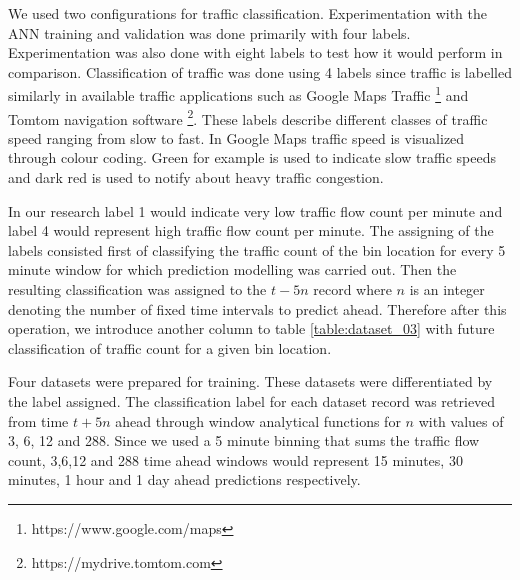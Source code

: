 \documentclass[12pt, a4paper]{report}
\theoremstyle{definition}
\theoremstyle{definition}%
\theoremstyle{definition}%
\theoremstyle{definition}%
\theoremstyle{definition}%
\theoremstyle{definition}%
\begin{document}
We used two configurations for traffic classification. Experimentation with the ANN training and validation was done primarily with four labels. Experimentation was also done with eight labels to test how it would perform in comparison. Classification of traffic was done using 4 labels since traffic is labelled similarly in available traffic applications such as Google Maps Traffic \footnote{https://www.google.com/maps} and Tomtom navigation software \footnote{https://mydrive.tomtom.com}. These labels describe different classes of traffic speed ranging from slow to fast. In Google Maps traffic speed is visualized through colour coding. Green for example is used to indicate slow traffic speeds and dark red is used to notify about heavy traffic congestion.  

In our research label 1 would indicate very low traffic flow count per minute and label 4 would represent high traffic flow count per minute. The assigning of the labels consisted first of classifying the traffic count of the bin location for every 5 minute window for which prediction modelling was carried out.  Then the resulting classification was assigned to the $t - 5n$ record where $n$ is an integer denoting the number of fixed time intervals to predict ahead. Therefore after this operation, we introduce another column to table \ref{table:dataset_03} with future classification of traffic count for a given bin location. 

Four datasets were prepared for training. These datasets were differentiated by the label assigned. The classification label for each dataset record was retrieved from time $t+5n$ ahead through window analytical functions for $n$ with values of 3, 6, 12 and 288.  Since we used a 5 minute binning that sums the traffic flow count, 3,6,12 and 288  time ahead windows would represent 15 minutes, 30 minutes, 1 hour and 1 day ahead predictions respectively.
\end{document}
